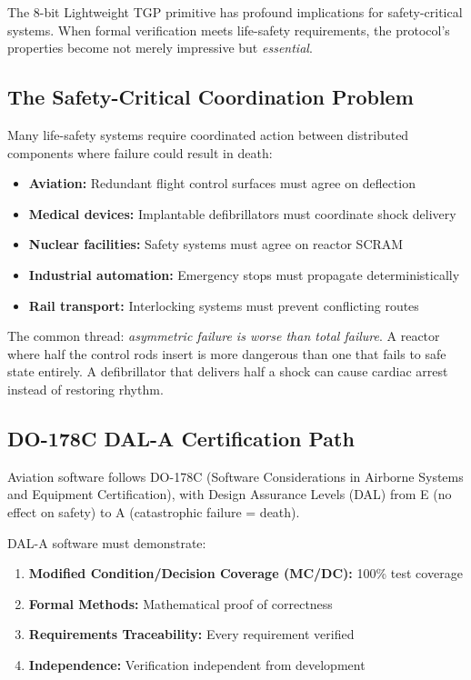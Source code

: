 
The 8-bit Lightweight TGP primitive has profound implications for safety-critical systems. When formal verification meets life-safety requirements, the protocol's properties become not merely impressive but \emph{essential}.

\subsection{The Safety-Critical Coordination Problem}

Many life-safety systems require coordinated action between distributed components where failure could result in death:

\begin{itemize}
    \item \textbf{Aviation:} Redundant flight control surfaces must agree on deflection
    \item \textbf{Medical devices:} Implantable defibrillators must coordinate shock delivery
    \item \textbf{Nuclear facilities:} Safety systems must agree on reactor SCRAM
    \item \textbf{Industrial automation:} Emergency stops must propagate deterministically
    \item \textbf{Rail transport:} Interlocking systems must prevent conflicting routes
\end{itemize}

The common thread: \emph{asymmetric failure is worse than total failure}. A reactor where half the control rods insert is more dangerous than one that fails to safe state entirely. A defibrillator that delivers half a shock can cause cardiac arrest instead of restoring rhythm.

\subsection{DO-178C DAL-A Certification Path}

Aviation software follows DO-178C (Software Considerations in Airborne Systems and Equipment Certification), with Design Assurance Levels (DAL) from E (no effect on safety) to A (catastrophic failure = death).

\begin{definition}
DAL-A software must demonstrate:
\begin{enumerate}
    \item \textbf{Modified Condition/Decision Coverage (MC/DC):} 100\% test coverage
    \item \textbf{Formal Methods:} Mathematical proof of correctness
    \item \textbf{Requirements Traceability:} Every requirement verified
    \item \textbf{Independence:} Verification independent from development
\end{enumerate}
\end{definition}

